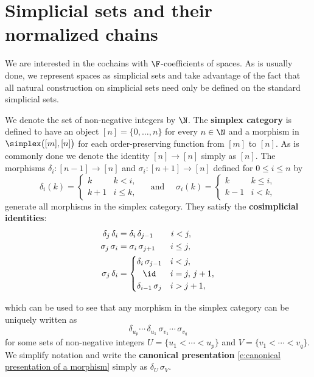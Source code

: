 
\section{Simplicial sets and their normalized chains} \label{s:preliminaries}

We are interested in the cochains with $\F$-coefficients of spaces.
As is usually done, we represent spaces as simplicial sets and take advantage of the fact that all natural construction on simplicial sets need only be defined on the standard simplicial sets.

We denote the set of non-negative integers by $\N$.
The \textbf{simplex category} is defined to have an object $[n] = \{0, \dots, n\}$ for every $n \in \N$ and a morphism in $\simplex \big([m], [n] \big)$ for each order-preserving function from $[m]$ to $[n]$.
As is commonly done we denote the identity $[n] \to [n]$ simply as $[n]$.
The morphisms $\delta_i \colon [n-1] \to [n]$ and $\sigma_i \colon [n+1] \to [n]$ defined for $0 \leq i \leq n$ by
\[
\delta_i(k) =
\begin{cases} k & k < i, \\ k+1 & i \leq k, \end{cases}
\quad \text{ and } \quad
\sigma_i(k) =
\begin{cases} k & k \leq i, \\ k-1 & i < k, \end{cases}
\]
generate all morphisms in the simplex category.
They satisfy the \textbf{cosimplicial identities}:
\begin{equation} \label{e:cosimplicial identities}
\begin{split}
\delta_j \, \delta_i &=
\delta_i \, \delta_{j-1} \hspace*{20.9pt} i < j, \\
\sigma_j \, \sigma_i &=
\sigma_i \, \sigma_{j+1} \hspace*{17.9pt} i \leq j, \\
\sigma_j \, \delta_i &=
\begin{cases}
\delta_i \, \sigma_{j-1} & i < j, \\
\hfil \id & i = j,\, j+1, \\
\delta_{i-1} \, \sigma_{j} & i > j + 1,
\end{cases}
\end{split}
\end{equation}

which can be used to see that any morphism in the simplex category can be uniquely written as
\begin{equation} \label{e:canonical presentation of a morphism}
\delta_{u_{p}} \cdots\, \delta_{u_1}\, \sigma_{v_1} \cdots\, \sigma_{v_q}
\end{equation}
for some sets of non-negative integers $U = \{u_1 < \cdots < u_{p}\}$ and $V = \{v_1 < \cdots < v_{q}\}$.
We simplify notation and write the \textbf{canonical presentation} \eqref{e:canonical presentation of a morphism} simply as $\delta_U\, \sigma_V$.

